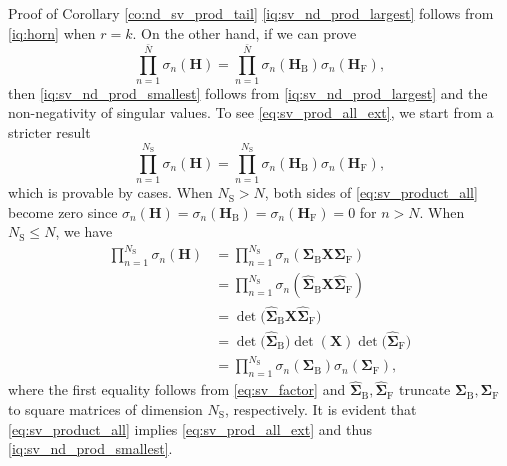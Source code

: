 \documentclass[journal]{IEEEtran}
\begin{document}
\begin{appendix}
	\begin{subsection}{Proof of Corollary \ref{co:nd_sv_prod_tail}}
		\label{ap:nd_sv_prod_tail}
		\eqref{iq:sv_nd_prod_largest} follows from \eqref{iq:horn} when $r = k$.
		On the other hand, if we can prove
		\begin{equation}
			\label{eq:sv_prod_all_ext}
			\prod_{n=1}^{\bar{N}} \sigma_n(\mathbf{H}) = \prod_{n=1}^{\bar{N}} \sigma_n(\mathbf{H}_\mathrm{B}) \sigma_n(\mathbf{H}_\mathrm{F}),
		\end{equation}
		then \eqref{iq:sv_nd_prod_smallest} follows from \eqref{iq:sv_nd_prod_largest} and the non-negativity of singular values.
		To see \eqref{eq:sv_prod_all_ext}, we start from a stricter result
		\begin{equation}
			\label{eq:sv_product_all}
			\prod_{n=1}^{N_\mathrm{S}} \sigma_n(\mathbf{H}) = \prod_{n=1}^{N_\mathrm{S}} \sigma_n(\mathbf{H}_\mathrm{B}) \sigma_n(\mathbf{H}_\mathrm{F}),
		\end{equation}
		which is provable by cases.
		When $N_\mathrm{S} > N$, both sides of \eqref{eq:sv_product_all} become zero since $\sigma_n(\mathbf{H}) = \sigma_n(\mathbf{H}_\mathrm{B}) = \sigma_n(\mathbf{H}_\mathrm{F}) = 0$ for $n > N$.
		When $N_\mathrm{S} \le N$, we have
		\begin{equation*}
			\begin{split}
				\prod\nolimits_{n=1}^{N_\mathrm{S}} \sigma_n(\mathbf{H})
				& = \prod\nolimits_{n=1}^{N_\mathrm{S}} \sigma_n(\mathbf{\Sigma}_\mathrm{B} \mathbf{X} \mathbf{\Sigma}_\mathrm{F})             \\
				& = \prod\nolimits_{n=1}^{N_\mathrm{S}} \sigma_n(\hat{\mathbf{\Sigma}}_\mathrm{B} \mathbf{X} \hat{\mathbf{\Sigma}}_\mathrm{F}) \\
				& = \det\bigl(\hat{\mathbf{\Sigma}}_\mathrm{B} \mathbf{X} \hat{\mathbf{\Sigma}}_\mathrm{F}\bigr)                               \\
				& = \det\bigl(\hat{\mathbf{\Sigma}}_\mathrm{B}\bigr) \det(\mathbf{X}) \det\bigl(\hat{\mathbf{\Sigma}}_\mathrm{F}\bigr)         \\
				& = \prod\nolimits_{n=1}^{N_\mathrm{S}} \sigma_n(\mathbf{\Sigma}_\mathrm{B}) \sigma_n(\mathbf{\Sigma}_\mathrm{F}),
			\end{split}
		\end{equation*}
		where the first equality follows from \eqref{eq:sv_factor} and $\hat{\mathbf{\Sigma}}_\mathrm{B}, \hat{\mathbf{\Sigma}}_\mathrm{F}$ truncate $\mathbf{\Sigma}_\mathrm{B}, \mathbf{\Sigma}_\mathrm{F}$ to square matrices of dimension $N_\mathrm{S}$, respectively.
		It is evident that \eqref{eq:sv_product_all} implies \eqref{eq:sv_prod_all_ext} and thus \eqref{iq:sv_nd_prod_smallest}.
	\end{subsection}


\end{appendix}
\end{document}
